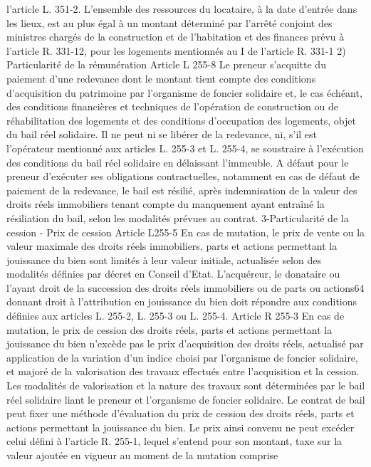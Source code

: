\documentclass[11pt,a4paper]{report}
\begin{document}
l'article L. 351-2. L'ensemble des ressources du locataire, à la date d'entrée dans les lieux, est au plus égal à un
montant déterminé par l'arrêté conjoint des ministres chargés de la construction et de l'habitation et des finances
prévu à l'article R. 331-12, pour les logements mentionnés au I de l'article R. 331-1
2) Particularité de la rémunération
Article L 255-8
Le preneur s'acquitte du paiement d'une redevance dont le montant tient compte des conditions d'acquisition du
patrimoine par l'organisme de foncier solidaire et, le cas échéant, des conditions financières et techniques de
l'opération de construction ou de réhabilitation des logements et des conditions d'occupation des logements,
objet du bail réel solidaire. Il ne peut ni se libérer de la redevance, ni, s'il est l'opérateur mentionné aux articles
L. 255-3 et L. 255-4, se soustraire à l'exécution des conditions du bail réel solidaire en délaissant l'immeuble.
A défaut pour le preneur d'exécuter ses obligations contractuelles, notamment en cas de défaut de paiement de
la redevance, le bail est résilié, après indemnisation de la valeur des droits réels immobiliers tenant compte du
manquement ayant entraîné la résiliation du bail, selon les modalités prévues au contrat.
3-Particularité de la cession
- Prix de cession
Article L255-5
En cas de mutation, le prix de vente ou la valeur maximale des droits réels immobiliers, parts et actions
permettant la jouissance du bien sont limités à leur valeur initiale, actualisée selon des modalités définies par
décret en Conseil d'Etat.
L'acquéreur, le donataire ou l'ayant droit de la succession des droits réels immobiliers ou de parts ou actions64
donnant droit à l'attribution en jouissance du bien doit répondre aux conditions définies aux articles L. 255-2, L.
255-3 ou L. 255-4.
Article R 255-3
En cas de mutation, le prix de cession des droits réels, parts et actions permettant la jouissance du bien
n'excède pas le prix d'acquisition des droits réels, actualisé par application de la variation d'un indice choisi par
l'organisme de foncier solidaire, et majoré de la valorisation des travaux effectués entre l'acquisition et la
cession. Les modalités de valorisation et la nature des travaux sont déterminées par le bail réel solidaire liant le
preneur et l'organisme de foncier solidaire.
Le contrat de bail peut fixer une méthode d'évaluation du prix de cession des droits réels, parts et actions
permettant la jouissance du bien.
Le prix ainsi convenu ne peut excéder celui défini à l'article R. 255-1, lequel s'entend pour son montant, taxe sur
la valeur ajoutée en vigueur au moment de la mutation comprise
\end{document}
